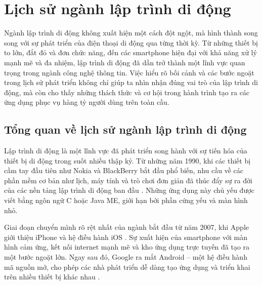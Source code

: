 \section{Lịch sử ngành lập trình di động}
\begin{flushleft}
  \hspace*{0.8cm}Ngành lập trình di động không xuất hiện một cách đột ngột, mà hình thành song song với sự phát triển của điện thoại di động qua từng thời kỳ. Từ những thiết bị to lớn, đắt đỏ và đơn chức năng, đến các smartphone hiện đại với khả năng xử lý mạnh mẽ và đa nhiệm, lập trình di động đã dần trở thành một lĩnh vực quan trọng trong ngành công nghệ thông tin. Việc hiểu rõ bối cảnh và các bước ngoặt trong lịch sử phát triển không chỉ giúp ta nhìn nhận đúng vai trò của lập trình di động, mà còn cho thấy những thách thức và cơ hội trong hành trình tạo ra các ứng dụng phục vụ hàng tỷ người dùng trên toàn cầu.
\end{flushleft}
\subsection{Tổng quan về lịch sử ngành lập trình di động}
\renewcommand{\labelitemi}{--}  

\begin{flushleft}
  \hspace*{0.8cm}Lập trình di động là một lĩnh vực đã phát triển song hành với sự tiến hóa của thiết bị di động trong suốt nhiều thập kỷ. Từ những năm 1990, khi các thiết bị cầm tay đầu tiên như Nokia và BlackBerry bắt đầu phổ biến, nhu cầu về các phần mềm cơ bản như lịch, máy tính và trò chơi đơn giản đã thúc đẩy sự ra đời của các nền tảng lập trình di động ban đầu \cite{javaME-nokia}. Những ứng dụng này chủ yếu được viết bằng ngôn ngữ C hoặc Java ME, giới hạn bởi phần cứng yếu và màn hình nhỏ.
\end{flushleft}

\begin{flushleft}
  \hspace*{0.8cm}Giai đoạn chuyển mình rõ rệt nhất của ngành bắt đầu từ năm 2007, khi Apple giới thiệu iPhone và hệ điều hành iOS \cite{iphone2007}. Sự xuất hiện của smartphone với màn hình cảm ứng, kết nối internet mạnh mẽ và kho ứng dụng trực tuyến đã tạo ra một bước ngoặt lớn. Ngay sau đó, Google ra mắt Android – một hệ điều hành mã nguồn mở, cho phép các nhà phát triển dễ dàng tạo ứng dụng và triển khai trên nhiều thiết bị khác nhau \cite{android2008}.
\end{flushleft}

